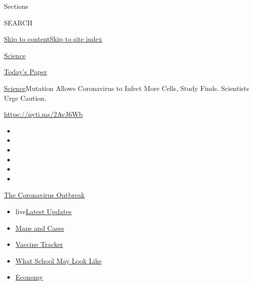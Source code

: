 Sections

SEARCH

\protect\hyperlink{site-content}{Skip to
content}\protect\hyperlink{site-index}{Skip to site index}

\href{https://www.nytimes.com/section/science}{Science}

\href{https://myaccount.nytimes.com/auth/login?response_type=cookie\&client_id=vi}{}

\href{https://www.nytimes.com/section/todayspaper}{Today's Paper}

\href{/section/science}{Science}\textbar{}Mutation Allows Coronavirus to
Infect More Cells, Study Finds. Scientists Urge Caution.

\url{https://nyti.ms/2AvJ6Wb}

\begin{itemize}
\item
\item
\item
\item
\item
\item
\end{itemize}

\href{https://www.nytimes.com/news-event/coronavirus?action=click\&pgtype=Article\&state=default\&region=TOP_BANNER\&context=storylines_menu}{The
Coronavirus Outbreak}

\begin{itemize}
\tightlist
\item
  live\href{https://www.nytimes.com/2020/08/01/world/coronavirus-covid-19.html?action=click\&pgtype=Article\&state=default\&region=TOP_BANNER\&context=storylines_menu}{Latest
  Updates}
\item
  \href{https://www.nytimes.com/interactive/2020/us/coronavirus-us-cases.html?action=click\&pgtype=Article\&state=default\&region=TOP_BANNER\&context=storylines_menu}{Maps
  and Cases}
\item
  \href{https://www.nytimes.com/interactive/2020/science/coronavirus-vaccine-tracker.html?action=click\&pgtype=Article\&state=default\&region=TOP_BANNER\&context=storylines_menu}{Vaccine
  Tracker}
\item
  \href{https://www.nytimes.com/interactive/2020/07/29/us/schools-reopening-coronavirus.html?action=click\&pgtype=Article\&state=default\&region=TOP_BANNER\&context=storylines_menu}{What
  School May Look Like}
\item
  \href{https://www.nytimes.com/live/2020/07/31/business/stock-market-today-coronavirus?action=click\&pgtype=Article\&state=default\&region=TOP_BANNER\&context=storylines_menu}{Economy}
\end{itemize}

